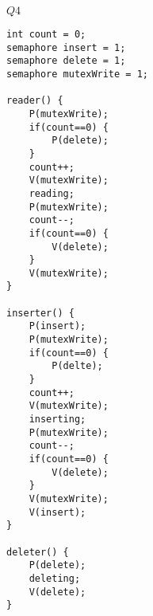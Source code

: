 \documentclass{article}
\begin{document}
{\LARGE $Q4$}
\lstset{language=C}
\begin{lstlisting}
int count = 0;
semaphore insert = 1;
semaphore delete = 1;
semaphore mutexWrite = 1;

reader() {
	P(mutexWrite);
	if(count==0) {
		P(delete);
	}
	count++;
	V(mutexWrite);
	reading;
	P(mutexWrite);
	count--;
	if(count==0) {
		V(delete);
	}
	V(mutexWrite);
}

inserter() {
	P(insert);
	P(mutexWrite);
	if(count==0) {
		P(delte);
	}
	count++;
	V(mutexWrite);
	inserting;
	P(mutexWrite);
	count--;
	if(count==0) {
		V(delete);
	}
	V(mutexWrite);
	V(insert);
}

deleter() {
	P(delete);
	deleting;
	V(delete);
}
\end{lstlisting}
\end{document}
